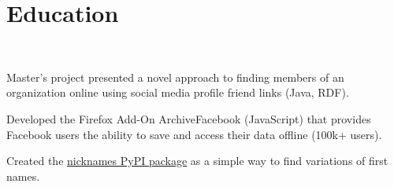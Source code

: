 \documentclass[]{deedy-resume-openfont}
\begin{document}
%
%
\section{Education}
\raggedright

\hfill {}\\
\begin{tightemize}
	\item Master's project presented a novel approach to finding members of an organization online using social media profile friend links (Java, RDF).
\end{tightemize}
\sectionsep
{}\hfill {}
\begin{tightemize}
	\item Developed the Firefox Add-On ArchiveFacebook (JavaScript) that provides Facebook users the ability to save and access their data offline (100k+ users).
	\item Created the \href{https://github.com/carltonnorthern/nickname-and-diminutive-names-lookup}{nicknames PyPI package} as a simple way to find variations of first names.
\end{tightemize}
\sectionsep


%
%
\end{document}
